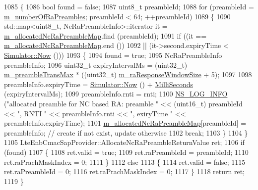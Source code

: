 \begin{DoxyCode}
1085 \{
1086         \textcolor{keywordtype}{bool} found = \textcolor{keyword}{false};
1087         uint8\_t preambleId;
1088         \textcolor{keywordflow}{for} (preambleId = \hyperlink{classns3_1_1MmWaveEnbMac_a502eb4952b5d1b4ec900b4a1a87c2b09}{m\_numberOfRaPreambles}; preambleId < 64; ++preambleId)
1089         \{
1090           std::map<uint8\_t, NcRaPreambleInfo>::iterator it = 
      \hyperlink{classns3_1_1MmWaveEnbMac_a3138c3896ca19151f6a08008669e07da}{m\_allocatedNcRaPreambleMap}.find (preambleId);
1091           \textcolor{keywordflow}{if} ((it ==  \hyperlink{classns3_1_1MmWaveEnbMac_a3138c3896ca19151f6a08008669e07da}{m\_allocatedNcRaPreambleMap}.end ())
1092               || (it->second.expiryTime < \hyperlink{classns3_1_1Simulator_ac3178fa975b419f7875e7105be122800}{Simulator::Now} ()))
1093             \{
1094               found = \textcolor{keyword}{true};
1095               NcRaPreambleInfo preambleInfo;
1096               uint32\_t expiryIntervalMs = (uint32\_t) \hyperlink{classns3_1_1MmWaveEnbMac_aef250f882f47179d01462f761f88be20}{m\_preambleTransMax} * ((uint32\_t) 
      \hyperlink{classns3_1_1MmWaveEnbMac_a8db7bd062ae554672abb903e9e729e75}{m\_raResponseWindowSize} + 5); 
1097               
1098               preambleInfo.expiryTime = \hyperlink{classns3_1_1Simulator_ac3178fa975b419f7875e7105be122800}{Simulator::Now} () + 
      \hyperlink{group__timecivil_gaf26127cf4571146b83a92ee18679c7a9}{MilliSeconds} (expiryIntervalMs);
1099               preambleInfo.rnti = rnti;
1100               \hyperlink{group__logging_gafbd73ee2cf9f26b319f49086d8e860fb}{NS\_LOG\_INFO} (\textcolor{stringliteral}{"allocated preamble for NC based RA: preamble "} << (uint16\_t)
      preambleId << \textcolor{stringliteral}{", RNTI "} << preambleInfo.rnti << \textcolor{stringliteral}{", exiryTime "} << preambleInfo.expiryTime);
1101               \hyperlink{classns3_1_1MmWaveEnbMac_a3138c3896ca19151f6a08008669e07da}{m\_allocatedNcRaPreambleMap}[preambleId] = preambleInfo; \textcolor{comment}{// create if
       not exist, update otherwise}
1102               \textcolor{keywordflow}{break};
1103             \}
1104         \}
1105         LteEnbCmacSapProvider::AllocateNcRaPreambleReturnValue ret;
1106         \textcolor{keywordflow}{if} (found)
1107         \{
1108           ret.valid = \textcolor{keyword}{true};
1109           ret.raPreambleId = preambleId;
1110           ret.raPrachMaskIndex = 0;
1111         \}
1112         \textcolor{keywordflow}{else}
1113         \{
1114           ret.valid = \textcolor{keyword}{false};
1115           ret.raPreambleId = 0;
1116           ret.raPrachMaskIndex = 0;
1117         \}
1118         \textcolor{keywordflow}{return} ret;
1119 \}
\end{DoxyCode}


